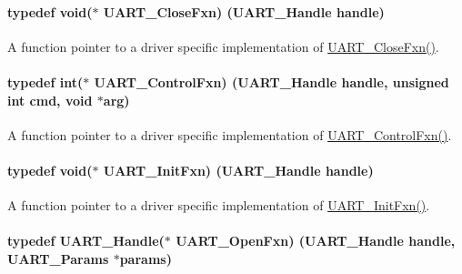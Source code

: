 \paragraph[{U\+A\+R\+T\+\_\+\+Close\+Fxn}]{\setlength{\rightskip}{0pt plus 5cm}typedef void($\ast$ U\+A\+R\+T\+\_\+\+Close\+Fxn) ({\bf U\+A\+R\+T\+\_\+\+Handle} handle)}\label{_u_a_r_t_8h_ae08ff15291bd6b21cb4e2eb1fce164a6}


A function pointer to a driver specific implementation of \hyperlink{_u_a_r_t_8h_ae08ff15291bd6b21cb4e2eb1fce164a6}{U\+A\+R\+T\+\_\+\+Close\+Fxn()}. 

\paragraph[{U\+A\+R\+T\+\_\+\+Control\+Fxn}]{\setlength{\rightskip}{0pt plus 5cm}typedef int($\ast$ U\+A\+R\+T\+\_\+\+Control\+Fxn) ({\bf U\+A\+R\+T\+\_\+\+Handle} handle, unsigned int cmd, void $\ast$arg)}\label{_u_a_r_t_8h_a4fc98447e6dd805e2d072917e8e6da3b}


A function pointer to a driver specific implementation of \hyperlink{_u_a_r_t_8h_a4fc98447e6dd805e2d072917e8e6da3b}{U\+A\+R\+T\+\_\+\+Control\+Fxn()}. 

\paragraph[{U\+A\+R\+T\+\_\+\+Init\+Fxn}]{\setlength{\rightskip}{0pt plus 5cm}typedef void($\ast$ U\+A\+R\+T\+\_\+\+Init\+Fxn) ({\bf U\+A\+R\+T\+\_\+\+Handle} handle)}\label{_u_a_r_t_8h_a2b3e89df3065fffb47e7354067c14d1b}


A function pointer to a driver specific implementation of \hyperlink{_u_a_r_t_8h_a2b3e89df3065fffb47e7354067c14d1b}{U\+A\+R\+T\+\_\+\+Init\+Fxn()}. 

\paragraph[{U\+A\+R\+T\+\_\+\+Open\+Fxn}]{\setlength{\rightskip}{0pt plus 5cm}typedef {\bf U\+A\+R\+T\+\_\+\+Handle}($\ast$ U\+A\+R\+T\+\_\+\+Open\+Fxn) ({\bf U\+A\+R\+T\+\_\+\+Handle} handle, {\bf U\+A\+R\+T\+\_\+\+Params} $\ast$params)}\label{_u_a_r_t_8h_a39e21ac60f24eb9ce32286e21de713d1}


